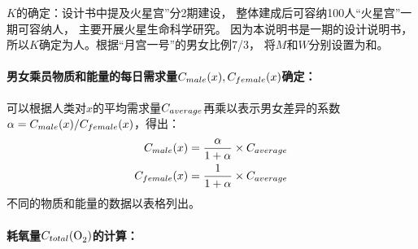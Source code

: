 \documentclass[a4paper]{standalone}
\begin{document}
$K$的确定：设计书中提及火星宫”分2期建设， 整体建成后可容纳100人“火星宫”一期可容纳\TotalCrews 人，
主要开展火星生命科学研究\cite{任务设计书}。
因为本说明书是一期的设计说明书，所以$K$确定为\TotalCrews 人。根据“月宫一号”的男女比例7/3，
将$M$和$W$分别设置为\MaleNumer 和\FemaleNumber 。

\paragraph{男女乘员物质和能量的每日需求量$C_{male}(x), C_{female}(x)$确定：}

可以根据人类对$x$的平均需求量$C_{average}$再乘以表示男女差异的系数 $\alpha = C_{male}(x) / C_{female}(x)$，得出：
\begin{align}
  C_{male}(x) &= \frac{\alpha}{1+\alpha} \times C_{average} \\
  C_{female}(x) &= \frac{1}{1+\alpha} \times C_{average}
\end{align}
不同的物质和能量的数据以表格列出。

\def\Oxygen{\ce{O2}}
\def\OxygenUnit{kg/(person•day)}
\def\OxygenConsume{\TotalConsume[\Oxygen]}
\def\MaleOxygen{0.654}
\def\FemaleOxygen{0.306}
\def\TotalOxygen{54.960}


\paragraph{耗氧量$\OxygenConsume$的计算：}
\end{document}
